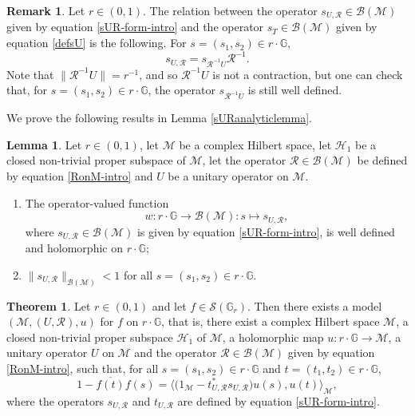 \documentclass[12pt,reqno]{amsart}
\numberwithin{equation}{section}
\theoremstyle{definition}
\newtheorem{lem}[equation]{Lemma}
\newtheorem{thm}[equation]{Theorem}
\newtheorem{remark}[equation]{Remark}
\begin{document}
\begin{remark} Let $r\in(0,1)$.
The relation between the operator $s_{U,\mathcal{R}}\in\mathcal{B(M)}$ given by equation \eqref{sUR-form-intro}
and  the operator $s_T\in\mathcal{B(M)}$ given by equation \eqref{defsU} is the following.
For $s=(s_{1},s_{2})\in r\cdot\mathbb{G}$,
\begin{equation} \label{sUR-sT}
s_{U,\mathcal{R}} = s_{\mathcal{R}^{-1}U}\mathcal{R}^{-1}.
\end{equation}
Note that $\|\mathcal{R}^{-1}U\| = r^{-1}$, and so $\mathcal{R}^{-1}U$ is not a contraction, but 
one can check that, for $s=(s_{1},s_{2})\in r\cdot\mathbb{G}$, the operator $s_{\mathcal{R}^{-1}U}$ is still well defined.
\end{remark}

We prove the following results in Lemma \ref{sURanalyticlemma}.
\begin{lem}\label{sURanalyticlemma-intro} Let $r\in(0,1)$, let $\mathcal{M}$ be a complex Hilbert space, let $\mathcal{H}_{1}$ be a closed non-trivial proper subspace of $\mathcal{M}$, let 
the operator $\mathcal{R} \in\mathcal{B(M)}$ be defined by equation \eqref{RonM-intro} and $U$ be a unitary operator on $\mathcal{M}$.
\begin{enumerate}
    \item The operator-valued function 
     $$w:r\cdot\mathbb{G}\rightarrow \mathcal{B(M)} : s\mapsto s_{U,\mathcal{R}},$$ 
where $s_{U,\mathcal{R}}\in\mathcal{B(M)}$ is given by equation \eqref{sUR-form-intro},   
is well defined and holomorphic on $r\cdot\mathbb{G}$;
    \item $\|s_{U,\mathcal{R}}\|_{\mathcal{B(M)}}< 1$ for all $s=(s_{1},s_{2})\in r\cdot\mathbb{G}$.
\end{enumerate}
\end{lem}

\begin{thm}\label{modelforsur-intro}
Let $r\in(0,1)$ and let $f\in\mathcal{S}(\mathbb{G}_{r})$. Then there exists a model $(\mathcal{M}, (U,\mathcal{R}), u)$ for $f$ on $r\cdot \mathbb{G}$, that is, there exist a complex Hilbert space $\mathcal{M}$,  a closed non-trivial proper subspace  $\mathcal{H}_{1}$ of $\mathcal{M}$, a holomorphic map $u:r\cdot \mathbb{G}\rightarrow \mathcal{M}$, a unitary operator $U$ on $\mathcal{M}$ and 
the operator $\mathcal{R} \in\mathcal{B(M)}$ given by equation \eqref{RonM-intro},
such that, for all $s=(s_{1},s_{2})\in r\cdot\mathbb{G}$ and $t=(t_{1},t_{2})\in r \cdot \mathbb{G}$,
\begin{equation}\label{grcorollary-intro}
1- \overline{f(t)}f(s) =\Bigg\langle  \bigg(1_{\mathcal{M}}-t_{U,\mathcal{R}}^{*}s_{U,\mathcal{R}}\bigg)u(s),u(t)\Bigg\rangle_{\mathcal{M}},
  \end{equation}
where the operators $s_{U,\mathcal{R}}$ and $t_{U,\mathcal{R}}$ are defined by 
equation \eqref{sUR-form-intro}.
\end{thm}
\end{document}
